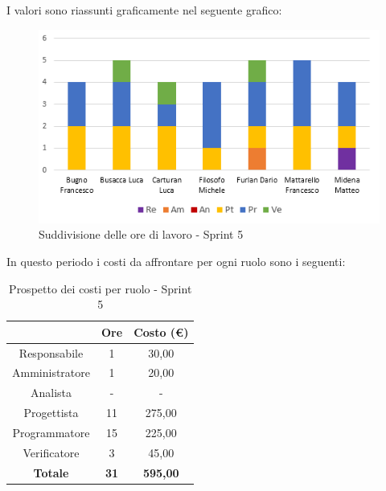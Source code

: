 I valori sono riassunti graficamente nel seguente grafico:

\begin{figure}[H]
  \centering
  \includegraphics[scale=1.0]{immagini/5Sprint_oreLavoro.png}
  \caption{Suddivisione delle ore di lavoro - Sprint 5}
\end{figure}

\pagebreak
In questo periodo i costi da affrontare per ogni ruolo sono i seguenti:

\begin{table}[H]
  \centering
  \renewcommand{\arraystretch}{1.8}
  \begin{tabular}{c|c|c}
    \rowcolor[HTML]{125E28}
    \multicolumn{1}{c}{\color[HTML]{FFFFFF}\textbf{Ruolo}}
                    & \multicolumn{1}{c}{\color[HTML]{FFFFFF}\textbf{Ore}}
                    & \multicolumn{1}{c}{\color[HTML]{FFFFFF}\textbf{Costo (€)}}                   \\
    \hline
    Responsabile    & 1                                                          & 30,00           \\
    Amministratore  & 1                                                          & 20,00           \\
    Analista        & -                                                          & -               \\
    Progettista     & 11                                                         & 275,00          \\
    Programmatore   & 15                                                         & 225,00          \\
    Verificatore    & 3                                                          & 45,00           \\
    \textbf{Totale} & \textbf{31}                                                & \textbf{595,00}
  \end{tabular}
  \caption{Prospetto dei costi per ruolo - Sprint 5}
\end{table}

